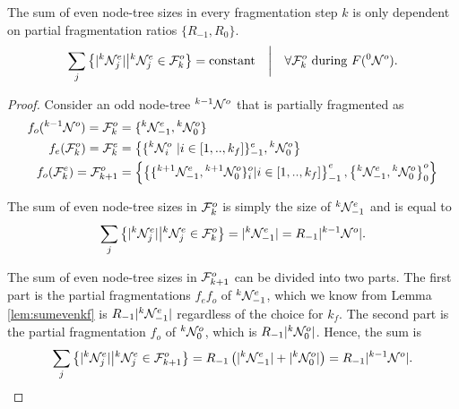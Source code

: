 \begin{lemma}\label{lem:equalevensum}
  The sum of even node-tree sizes in every fragmentation step $k$ is only dependent on partial fragmentation ratios $\{R_{-1}, R_0\}$.
  \begin{equation}\label{eq:equalevensum}
    \sum_j{ \left\{ \abs{\pre{k}\nset_j^e} \big| \pre{k}\nset_j^e \in \m{F}^o_k \right\} } = \text{constant}
    \hspace{1em} \bigg| \hspace{1em} \forall \m{F}_k^o \text{ during } F(\pre{0}\nset^o).
  \end{equation}
\end{lemma}
\begin{proof}
  Consider an odd node-tree ${}^{k-1}\mathcal{N}^o$ that is partially fragmented as
  \begin{align*}
    f_o({}^{k-1}\mathcal{N}^o) = \mathcal{F}^o_k     & = \{{}^{k}\mathcal{N}^e_{-1}, {}^{k}\mathcal{N}^o_0 \}                                                                                                                                 \\
    f_e(\mathcal{F}^o_k)        = \mathcal{F}^e_k     & = \left\{ \{{}^{k}\mathcal{N}^o_i\ | i \in [1,..,k_f] \}^e_{-1}, {}^{k}\mathcal{N}^{o}_0 \right\}                                                                                      \\
    f_o(\mathcal{F}^e_k )       = \mathcal{F}^o_{k+1} & = \left\{ \left\{ \{{}^{k+1}\mathcal{N}^e_{-1}, {}^{k+1}\mathcal{N}^o_0\}_i^o | i \in [1,..,k_f] \right\}^e_{-1}, \left\{{}^{k}\mathcal{N}^e_{-1}, {}^{k}\mathcal{N}^o_0 \right\}^{o}_0 \right\}
  \end{align*}

  The sum of even node-tree sizes in $\mathcal{F}^o_k$ is simply the size of ${}^{k}\mathcal{N}^e_{-1}$ and is equal to
  \begin{equation*}
    \sum_j{ \left\{ \lvert{}^{k}\mathcal{N}_j^e\rvert \big| {}^{k}\mathcal{N}_j^e \in \mathcal{F}^o_k \right\} } = \lvert{}^{k}\mathcal{N}^e_{-1}\rvert = R_{-1}\lvert{}^{k-1}\mathcal{N}^o\rvert.
  \end{equation*}

  The sum of even node-tree sizes in $\mathcal{F}^o_{k+1}$ can be divided into two parts. The first part is the partial fragmentations $f_e f_o$ of ${}^{k}\mathcal{N}^e_{-1}$, which we know from Lemma \ref{lem:sumevenkf} is $R_{-1}|{}^{k}\mathcal{N}^e_{-1}|$ regardless of the choice for $k_f$. The second part is the partial fragmentation $f_o$ of ${}^{k}\mathcal{N}^o_0$, which is $R_{-1}|{}^{k}\mathcal{N}^o_0|$. Hence, the sum is
  \begin{equation*}
    \sum_j{ \left\{ \lvert{}^{k}\mathcal{N}_j^e\rvert \big| {}^{k}\mathcal{N}_j^e \in \mathcal{F}^o_{k+1} \right\} } = R_{-1} \left( \lvert{}^{k}\mathcal{N}^e_{-1}\rvert + \lvert{}^{k}\mathcal{N}^o_0\rvert \right) = R_{-1}\lvert{}^{k-1}\mathcal{N}^o\rvert.
  \end{equation*}
\end{proof}

